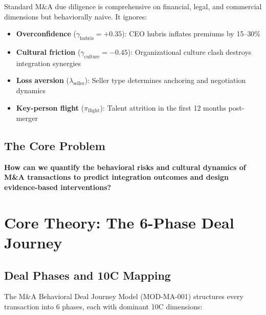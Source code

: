 Standard M\&A due diligence is comprehensive on financial, legal, and commercial
dimensions but behaviorally naive. It ignores:
\begin{itemize}[nosep]
    \item \textbf{Overconfidence} ($\gamma_{\text{hubris}} = +0.35$): CEO hubris inflates
          premiums by 15--30\% \citep{malmendier2008ceos}
    \item \textbf{Cultural friction} ($\gamma_{\text{culture}} = -0.45$): Organizational
          culture clash destroys integration synergies
    \item \textbf{Loss aversion} ($\lambda_{\text{seller}}$): Seller type determines
          anchoring and negotiation dynamics
    \item \textbf{Key-person flight} ($\pi_{\text{flight}}$): Talent attrition in the
          first 12 months post-merger
\end{itemize}

\subsection{The Core Problem}

\begin{tcolorbox}[colback=red!5!white, colframe=red!75!black,
    title=The Fundamental Question]
\textbf{How can we quantify the behavioral risks and cultural dynamics of M\&A
transactions to predict integration outcomes and design evidence-based interventions?}
\end{tcolorbox}


\section{Core Theory: The 6-Phase Deal Journey}
\label{sec:ma-theory}

\subsection{Deal Phases and 10C Mapping}

The M\&A Behavioral Deal Journey Model (MOD-MA-001) structures every transaction
into 6 phases, each with dominant 10C dimensions:

